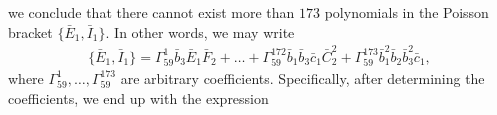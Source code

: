 \documentclass[10pt]{amsart}
\theoremstyle{definition}
\theoremstyle{corollary}
\theoremstyle{remark}
\theoremstyle{conclusion}
\begin{document}
we conclude that there cannot exist more than $173$ polynomials in the Poisson bracket $\{\bar{E}_1,\bar{I}_1\}$. In other words, we may write \begin{align}
     \{\bar{E}_1,\bar{I}_1\} = \Gamma_{59}^{1} \bar{b}_3\bar{E}_1\bar{F}_2 +  \ldots + \Gamma_{59}^{172} \bar{b}_1\bar{b}_3 \bar{c}_1 \bar{C}_2^2 + \Gamma_{59}^{173} \bar{b}_1^2 \bar{b}_2 \bar{b}_3^2 \bar{c}_1,
\end{align} where $\Gamma_{59}^{1},\ldots,\Gamma_{59}^{173}$ are arbitrary coefficients.   Specifically, after determining the coefficients, we end up with the expression 
\end{document}
